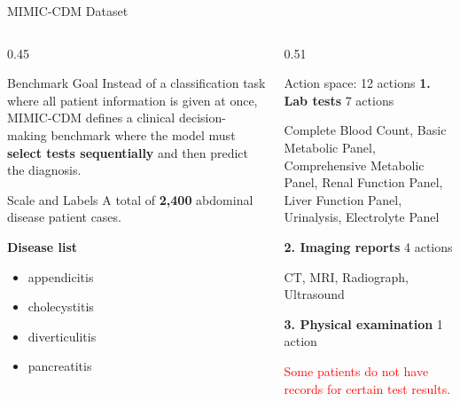 \documentclass[
11pt,notheorems,hyperref={pdfauthor=whatever}
]{beamer}
\begin{document}
\begin{frame}{MIMIC-CDM Dataset}
\vspace{0.15em}
\begin{columns}[T,onlytextwidth]
\begin{column}{0.45\textwidth}
\begin{block}{Benchmark Goal}
\small
Instead of a classification task where all patient information is given at once, MIMIC-CDM defines a clinical decision-making benchmark where the model must \textbf{select tests sequentially} and then predict the diagnosis.
\end{block}

\vspace{0.35em}
\begin{block}{Scale and Labels}
\small
A total of \textbf{2,400} abdominal disease patient cases.

\vspace{0.35em}
\textbf{Disease list}
\begin{itemize}
\item appendicitis
\item cholecystitis
\item diverticulitis
\item pancreatitis
\end{itemize}
\end{block}
\end{column}

\begin{column}{0.51\textwidth}
\begin{block}{Action space: 12 actions}
\small
\textbf{1. Lab tests} \hfill {\footnotesize 7 actions}

\vspace{0.15em}
{\footnotesize
Complete Blood Count, Basic Metabolic Panel, Comprehensive Metabolic Panel, Renal Function Panel, Liver Function Panel, Urinalysis, Electrolyte Panel
}

\vspace{0.65em}
\textbf{2. Imaging reports} \hfill {\footnotesize 4 actions}

\vspace{0.15em}
{\footnotesize CT, MRI, Radiograph, Ultrasound}

\vspace{0.65em}
\textbf{3. Physical examination} \hfill {\footnotesize 1 action}

\vspace{1.0em}
{\footnotesize\textcolor{red}{Some patients do not have records for certain test results.}}
\end{block}
\end{column}
\end{columns}
\end{frame}
\end{document}
